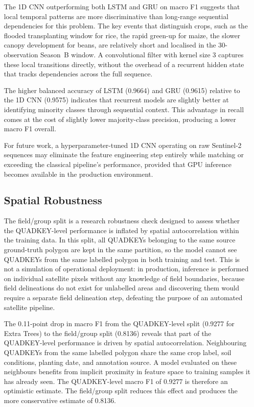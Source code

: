 The 1D CNN outperforming both LSTM and GRU on macro F1 suggests
that local temporal patterns are more discriminative than long-range
sequential dependencies for this problem. The key events that
distinguish crops, such as the flooded transplanting window for rice,
the rapid green-up for maize, the slower canopy development for
beans, are relatively short and localised in the 30-observation
Season~B window. A convolutional filter with kernel size 3 captures
these local transitions directly, without the overhead of a
recurrent hidden state that tracks dependencies across the full
sequence.

The higher balanced accuracy of LSTM (0.9664) and GRU (0.9615)
relative to the 1D CNN (0.9575) indicates that recurrent models
are slightly better at identifying minority classes through
sequential context. This advantage in recall comes at the cost of
slightly lower majority-class precision, producing a lower macro
F1 overall.

For future work, a hyperparameter-tuned 1D CNN operating on raw
Sentinel-2 sequences may eliminate the feature engineering step
entirely while matching or exceeding the classical pipeline's
performance, provided that GPU inference becomes available in
the production environment.


\subsection{Spatial Robustness}
\label{subsec:disc_spatial}

The field/group split is a research robustness check designed to
assess whether the QUADKEY-level performance is inflated by spatial
autocorrelation within the training data. In this split, all
QUADKEYs belonging to the same source ground-truth polygon are
kept in the same partition, so the model cannot see QUADKEYs from
the same labelled polygon in both training and test. This is not a
simulation of operational deployment: in production, inference is
performed on individual satellite pixels without any knowledge of
field boundaries, because field delineations do not exist for
unlabelled areas and discovering them would require a separate
field delineation step, defeating the purpose of an automated
satellite pipeline.

The 0.11-point drop in macro F1 from the QUADKEY-level split
(0.9277 for Extra Trees) to the field/group split (0.8136) reveals
that part of the QUADKEY-level performance is driven by spatial
autocorrelation. Neighbouring QUADKEYs from the same labelled
polygon share the same crop label, soil conditions, planting date,
and annotation source. A model evaluated on these neighbours
benefits from implicit proximity in feature space to training
samples it has already seen. The QUADKEY-level macro F1 of 0.9277
is therefore an optimistic estimate. The field/group split reduces
this effect and produces the more conservative estimate of 0.8136.

